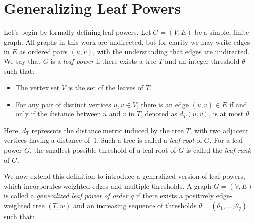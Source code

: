 \documentclass[11pt, letter]{article}
\theoremstyle{remark}
\begin{document}












\section{Generalizing Leaf Powers}
Let's begin by formally defining leaf powers. Let $G = (V, E)$ be a simple, finite graph. All graphs in this work are undirected, but for clarity we may write edges in $E$ as ordered pairs $(u, v)$, with the understanding that edges are undirected.
We say that $G$ is a \emph{leaf power} if there exists a tree $T$ and an integer threshold $\theta$ such that:

\begin{itemize} 
    \item The vertex set $V$ is the set of the leaves of $T$. 
    \item For any pair of distinct vertices $u, v \in V$, there is an edge $(u,v) \in E$ if and only if the distance between $u$ and $v$ in $T$, denoted as $d_T(u, v)$, is at most $\theta$. 
\end{itemize}

Here, $d_T$ represents the distance metric induced by the tree $T$, with two adjacent vertices having a distance of~$1$. Such a tree is called a \emph{leaf root} of $G$. For a leaf power $G$, the smallest possible threshold of a leaf root of $G$ is called the \emph{leaf rank} of $G$.

We now extend this definition to introduce a generalized version of leaf powers, which incorporates weighted edges and multiple thresholds. A graph $G = (V,E)$ is called a \textit{generalized leaf power of order $q$} if there exists a positively edge-weighted tree $(T, w)$ and an increasing sequence of thresholds $\theta = (\theta_1, \dots, \theta_q)$ such that:
\end{document}
